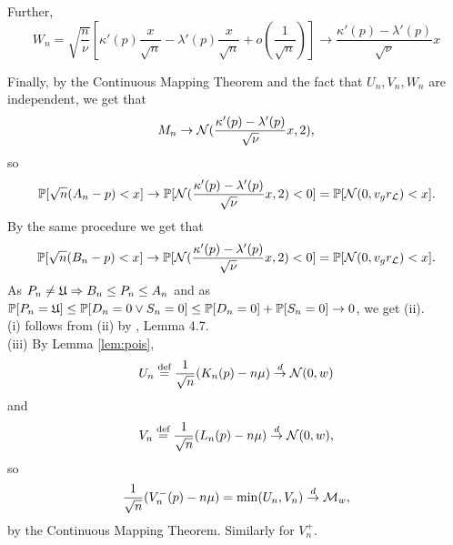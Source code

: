 \documentclass{aptpub}
\begin{document}
Further,
$$
W_n = {\sqrt{\frac n\nu}}\left[
\kappa'(p)\frac{x}{\sqrt{n}}-\lambda'(p)\frac{x}{\sqrt{n}}
+o\left(\frac 1{\sqrt{n}}\right)\right]\longrightarrow \frac{\kappa'(p)-\lambda'(p)}{\sqrt{\nu}}x
$$

Finally, by the Continuous Mapping Theorem and the fact that $U_n,V_n,W_n$ are independent, we get that $$M_n \rightarrow \mathcal{N}(\frac{\kappa'(p)-\lambda'(p)}{\sqrt{\nu}}x,2),$$
so
$$
\mathbb{P}[\sqrt{n}(A_n - p) < x] \rightarrow \mathbb{P}[\mathcal{N}(\frac{\kappa'(p)-\lambda'(p)}{\sqrt{\nu}}x,2)<0]
=\mathbb{P}[\mathcal{N}(0,v_g r_{\mathcal{L}})<x].
$$
By the same procedure we get that 
$$
\mathbb{P}[\sqrt{n}(B_n - p) < x] \rightarrow \mathbb{P}[\mathcal{N}(\frac{\kappa'(p)-\lambda'(p)}{\sqrt{\nu}}x,2)<0]
=\mathbb{P}[\mathcal{N}(0,v_g r_{\mathcal{L}})<x].
$$
As $P_n \neq \mathfrak{U} \Rightarrow B_n \leq P_n \leq A_n$ and as $\mathbb{P}[P_n=\mathfrak{U}] \leq \mathbb{P}[D_n=0 \vee S_n=0] \leq \mathbb{P}[D_n=0] + \mathbb{P}[S_n=0] \rightarrow 0$, we get (ii).\\
(i) follows from (ii) by \cite{Kallenberg02}, Lemma 4.7. \\
(iii) By Lemma \ref{lem:pois}, $$U_n \stackrel{\text{def}}{=} \frac{1}{\sqrt{n}}(K_n(p)-n\mu) \stackrel{d}  \rightarrow \mathcal{N}(0,w)$$ and $$V_n \stackrel{\text{def}}{=} \frac{1}{\sqrt{n}}(L_n(p)-n\mu) \stackrel{d}  \rightarrow \mathcal{N}(0,w),$$ so
$$
\frac{1}{\sqrt{n}}(V^-_n(p)-n\mu)=\min(U_n,V_n) \stackrel{d} 
 \rightarrow \mathcal{M}_{w},
$$
by the Continuous Mapping Theorem. Similarly for $V_n^+$.
\end{document}
